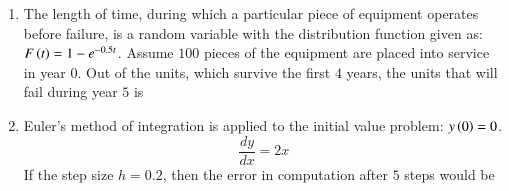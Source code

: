 \documentclass[journal,12pt,onecolumn]{IEEEtran}
\theoremstyle{remark}
\begin{document}
\begin{enumerate}
\item The length of time, during which a particular piece of equipment operates before failure, is a random variable with the distribution function given as: $F\left(t\right) = 1 - e^{-0.5t}$. Assume $100$ pieces of the equipment are placed into service in year $0$. Out of the units, which survive the first $4$ years, the units  that will fail during year $5$ is
\hfill{}
\begin{enumerate}
\end{enumerate}

\item Euler's method of integration is applied to the initial value problem: $y\left(0\right)=0$.
$$ \frac{dy}{dx} = 2x $$
If the step size $h=0.2$, then the error in computation  after $5$ steps would be
\hfill{}
\begin{enumerate}
\end{enumerate}


\end{enumerate}
\end{document}
